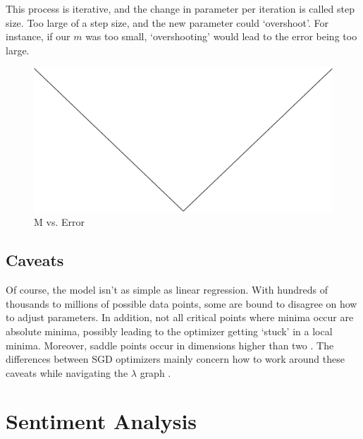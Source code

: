 \documentclass[titlepage,letterpaper]{article}
\begin{document}
This process is iterative, and the change in parameter per iteration is called step size. Too large of a step size, and the new parameter could `overshoot'. For instance, if our $m$ was too small, `overshooting' would lead to the error being too large.

	\begin{figure}[h]
	\centering 
	\label{fig:m_vs_error}
	\caption{M vs. Error}
	\includegraphics[scale=.11]{error_function.eps}
	\vspace{-55pt}
	\end{figure}


\subsection{Caveats}
 
 Of course, the model isn't as simple as linear regression. With hundreds of thousands to millions of possible data points, some are bound to disagree on how to adjust parameters. In addition, not all critical points where minima occur are absolute minima, possibly leading to the optimizer  getting `stuck' in a local minima. Moreover, saddle points occur in dimensions higher than two \cite{EMA}. The differences between SGD optimizers mainly concern how to work around these caveats while navigating the $\lambda$ graph \cite{EMA}.
 
\section{Sentiment Analysis}
\end{document}

